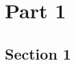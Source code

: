 \documentclass[module]{subfiles}
\begin{document}
\selectfont
\clearpage

\section{Part 1}
\begin{multicols}{2}

\subsection{Section 1}
\lipsum[1]

\end{multicols}
\end{document}
